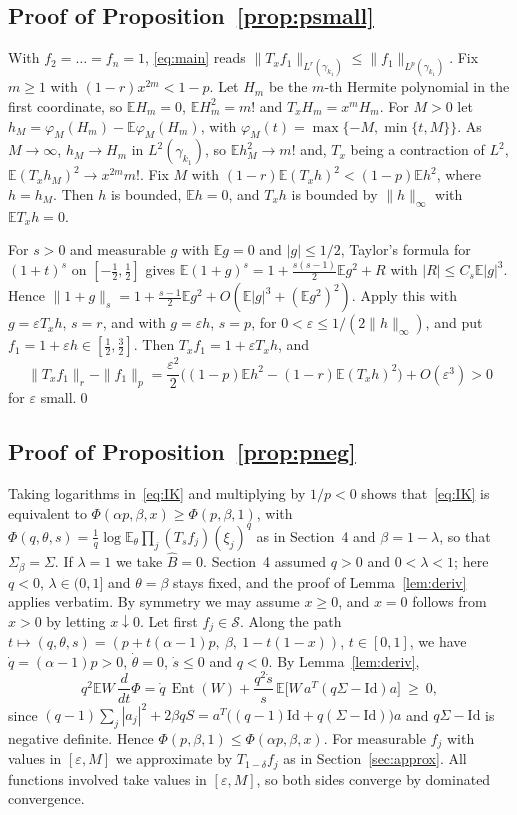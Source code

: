 \documentclass[11pt]{amsart}
\theoremstyle{definition}
\newcommand{\E}{\mathbb{E}}
\newcommand{\Ent}{\operatorname{Ent}}
\newcommand{\cS}{\mathcal{S}}
\newcommand{\Id}{\mathrm{Id}}
\begin{document}
\subsection{Proof of Proposition~\ref{prop:psmall}}
With $f_2=\dots=f_n=1$, \eqref{eq:main} reads $\|T_xf_1\|_{L^r(\gamma_{k_1})}\le\|f_1\|_{L^p(\gamma_{k_1})}$. Fix $m\ge1$ with
$(1-r)x^{2m}<1-p$. Let $H_m$ be the $m$-th Hermite polynomial in the first coordinate, so $\E H_m=0$,
$\E H_m^2=m!$ and $T_xH_m=x^mH_m$. For $M>0$ let $h_M=\varphi_M(H_m)-\E\varphi_M(H_m)$, with
$\varphi_M(t)=\max\{-M,\min\{t,M\}\}$. As $M\to\infty$, $h_M\to H_m$ in $L^2(\gamma_{k_1})$, so $\E h_M^2\to m!$ and,
$T_x$ being a contraction of $L^2$, $\E(T_xh_M)^2\to x^{2m}m!$. Fix $M$ with $(1-r)\E(T_xh)^2<(1-p)\E h^2$, where
$h=h_M$. Then $h$ is bounded, $\E h=0$, and $T_xh$ is bounded by $\|h\|_\infty$ with $\E T_xh=0$.

For $s>0$ and measurable $g$ with $\E g=0$ and $|g|\le1/2$, Taylor's formula for $(1+t)^s$ on $[-\frac12,\frac12]$
gives $\E(1+g)^s=1+\frac{s(s-1)}2\E g^2+R$ with $|R|\le C_s\E|g|^3$. Hence
$\|1+g\|_s=1+\frac{s-1}2\E g^2+O(\E|g|^3+(\E g^2)^2)$. Apply this with $g=\varepsilon T_xh$, $s=r$, and with
$g=\varepsilon h$, $s=p$, for $0<\varepsilon\le1/(2\|h\|_\infty)$, and put $f_1=1+\varepsilon h\in[\frac12,\frac32]$. Then
$T_xf_1=1+\varepsilon T_xh$, and
\[
\|T_xf_1\|_r-\|f_1\|_p=\frac{\varepsilon^2}2\Big((1-p)\E h^2-(1-r)\E(T_xh)^2\Big)+O(\varepsilon^3)>0
\]
for $\varepsilon$ small.\qed

\subsection{Proof of Proposition~\ref{prop:pneg}}
Taking logarithms in~\eqref{eq:IK} and multiplying by $1/p<0$ shows that~\eqref{eq:IK} is equivalent to
$\Phi(\alpha p,\beta,x)\ge\Phi(p,\beta,1)$, with $\Phi(q,\theta,s)=\frac1q\log\E_\theta\prod_j(T_sf_j)(\xi_j)^q$ as in
Section~4 and $\beta=1-\lambda$, so that $\Sigma_\beta=\Sigma$. If $\lambda=1$ we take $\widehat B=0$. Section~4
assumed $q>0$ and $0<\lambda<1$; here $q<0$, $\lambda\in(0,1]$ and $\theta=\beta$ stays fixed, and the proof of
Lemma~\ref{lem:deriv} applies verbatim. By symmetry we may assume $x\ge0$, and $x=0$ follows from $x>0$ by letting
$x\downarrow0$. Let first $f_j\in\cS$. Along the path $t\mapsto(q,\theta,s)=(p+t(\alpha-1)p,\ \beta,\ 1-t(1-x))$,
$t\in[0,1]$, we have $\dot q=(\alpha-1)p>0$, $\dot\theta=0$, $\dot s\le0$ and $q<0$. By Lemma~\ref{lem:deriv},
\[
q^2\E W\,\frac{d}{dt}\Phi=\dot q\,\Ent(W)+\frac{q^2\dot s}s\,\E\big[W\,a^T(q\Sigma-\Id)a\big]\ \ge\ 0,
\]
since $(q-1)\sum_j|a_j|^2+2\beta qS=a^T\big((q-1)\Id+q(\Sigma-\Id)\big)a$ and $q\Sigma-\Id$ is negative definite.
Hence $\Phi(p,\beta,1)\le\Phi(\alpha p,\beta,x)$. For measurable $f_j$ with values in $[\varepsilon,M]$ we
approximate by $T_{1-\delta}f_j$ as in Section~\ref{sec:approx}. All functions involved take values in
$[\varepsilon,M]$, so both sides converge by dominated convergence.
\end{document}
